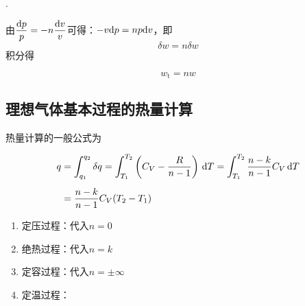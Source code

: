 . \dya[技术功]
\par 由$\dfrac{{\rm{d}} p}{p} = -n \dfrac{{\rm{d}} v}{v}$可得：$-v {\rm{d}} p = np {\rm{d}} v$，即
\begin{equation}
	\delta w = n \delta w
\end{equation}
积分得
\begin{itemizea}
	\item 
	\begin{equation}
		w_\text{t} = nw
	\end{equation}
\end{itemizea}

\vspace*{0.5em}
\subsection{理想气体基本过程的热量计算}
热量计算的一般公式为 
\begin{itemizea}
	\item
	\begin{equation}
		\begin{split}
			q & = \int_{q_1}^{q_2} \delta q = \int_{T_1}^{T_2} \left(C_V - \dfrac{R}{n - 1}\right)\,{\rm{d}} T = \int_{T_1}^{T_2} \dfrac{n-k}{n-1}C_V\,{\rm{d}} T \\[0.5em]
			& = \dfrac{n - k}{n - 1}C_V(T_2 - T_1)
		\end{split}
		\label{理想气体热量计算}
	\end{equation}
\end{itemizea}
\begin{enumerate}[(1) ]
	\item 定压过程：代入$n=0$
	\item 绝热过程：代入$n=k$
	\item 定容过程：代入$n = \pm \infty$
	\item 定温过程：
\end{enumerate}


